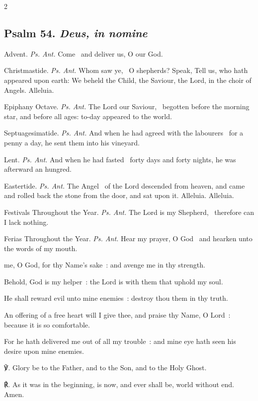 \begin{multicols}{2}
\subsection{Psalm 54. \textit{Deus, in nomine}}
\par\noindent
{\color{RubricRed}Advent.} \textit{Ps. Ant.} Come~{\dag} and deliver us, O our God.
\par\noindent
{\color{RubricRed}Christmastide.} \textit{Ps. Ant.} Whom saw ye,~{\dag} O shepherds? Speak, Tell us, who hath appeared upon earth: We beheld the Child, the Saviour, the Lord, in the choir of Angels. Alleluia.
\par\noindent
{\color{RubricRed}Epiphany Octave.} \textit{Ps. Ant.} The Lord our Saviour,~{\dag} begotten before the morning star, and before all ages: to-day appeared to the world.
\par\noindent
{\color{RubricRed}Septuagesimatide.} \textit{Ps. Ant.} And when he had agreed with the labourers~{\dag} for a penny a day, he sent them into his vineyard.
\par\noindent
{\color{RubricRed}Lent.} \textit{Ps. Ant.} And when he had fasted~{\dag} forty days and forty nights, he was afterward an hungred.
\par\noindent
{\color{RubricRed}Eastertide.} \textit{Ps. Ant.} The Angel~{\dag} of the Lord descended from heaven, and came and rolled back the stone from the door, and sat upon it. Alleluia. Alleluia.
\par\noindent
{\color{RubricRed}Festivals Throughout the Year.} \textit{Ps. Ant.} The Lord is my Shepherd,~{\dag} therefore can I lack nothing.
\par\noindent
{\color{RubricRed}Ferias Throughout the Year.} \textit{Ps. Ant.} Hear my prayer, O God~{\dag} and hearken unto the words of my mouth.%

 me, O God, for thy Name's sake~: and avenge me in thy strength.\par
{}
Behold, God is my helper~: the Lord is with them that uphold my soul.\par
{}He shall reward evil unto mine enemies~: destroy thou them in thy truth.\par
{}An offering of a free heart will I give thee, and praise thy Name, O Lord~: because it is so comfortable.\par
{}For he hath delivered me out of all my trouble~: and mine eye hath seen his desire upon mine enemies.\par
℣. Glory be to the Father, and to the Son, and to the Holy Ghost.\par
℟. As it was in the beginning, is now, and ever shall be, world without end. Amen.


\end{multicols}
